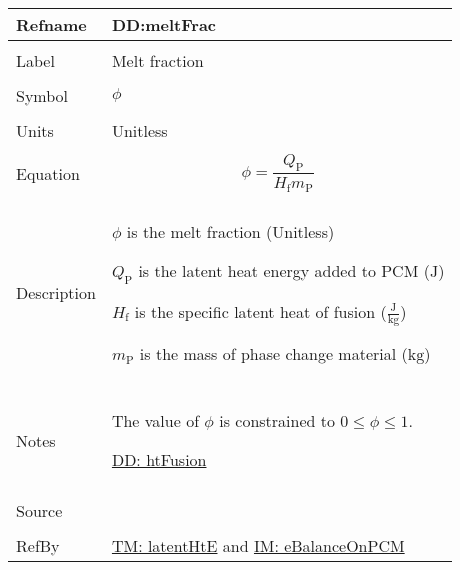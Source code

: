 \documentclass[12pt]{article}
\begin{document}
\vspace{\baselineskip}
\noindent
\begin{minipage}{\textwidth}
\begin{tabular}{>{\raggedright}p{}>{\raggedright\arraybackslash}p{}}
\toprule \textbf{Refname} & \textbf{DD:meltFrac}
\label{DD:meltFrac}
\\ \midrule \\
Label & Melt fraction
        
\\ \midrule \\
Symbol & $ϕ$
         
\\ \midrule \\
Units & Unitless
        
\\ \midrule \\
Equation & \begin{displaymath}
           ϕ=\frac{{Q_{\text{P}}}}{{H_{\text{f}}} {m_{\text{P}}}}
           \end{displaymath}
\\ \midrule \\
Description & \begin{symbDescription}
              \item{$ϕ$ is the melt fraction (Unitless)}
              \item{${Q_{\text{P}}}$ is the latent heat energy added to PCM (${\text{J}}$)}
              \item{${H_{\text{f}}}$ is the specific latent heat of fusion ($\frac{\text{J}}{\text{kg}}$)}
              \item{${m_{\text{P}}}$ is the mass of phase change material (${\text{kg}}$)}
              \end{symbDescription}
\\ \midrule \\
Notes & The value of $ϕ$ is constrained to $0\leq{}ϕ\leq{}1$.
        
        \hyperref[DD:htFusion]{DD: htFusion}
        
\\ \midrule \\
Source & \cite{koothoor2013}
         
\\ \midrule \\
RefBy & \hyperref[TM:latentHtE]{TM: latentHtE} and \hyperref[IM:eBalanceOnPCM]{IM: eBalanceOnPCM}
        
\\ \bottomrule
\end{tabular}
\end{minipage}
\end{document}
